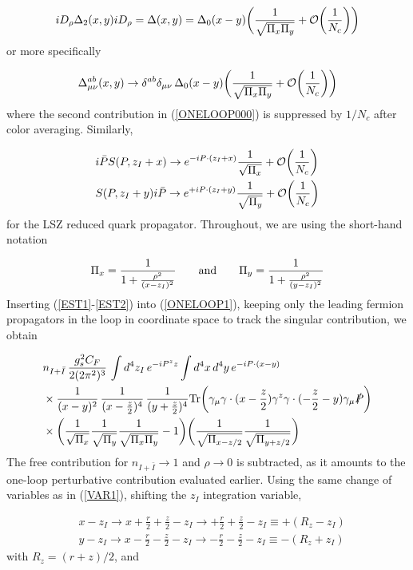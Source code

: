 \documentclass[11pt,aps,amsmath,amssymb,nofootinbib,notitlepage,longbibliography]{revtex4-1}
\newcommand{\be}{\begin{equation}}
\newcommand{\ee}{\end{equation}}
\begin{document}
\begin{align}
\label{ONELOOPX1}
iD_\rho\Delta_2(x,y)iD_\rho=\Delta(x,y)= \Delta_0(x-y)\bigg(\frac 1{\sqrt{\Pi_x\Pi_y}}+{\cal O}\bigg(\frac 1{N_c}\bigg)\bigg)
\end{align}
or more specifically


\be
\label{EST1}
\Delta^{ab}_{\mu\nu}(x,y)\rightarrow \delta^{ab}\delta_{\mu\nu}\,  \Delta_0(x-y)\bigg(\frac 1{\sqrt{\Pi_x\Pi_y}}+{\cal O}\bigg(\frac 1{N_c}\bigg)\bigg)
\ee
where the second contribution in (\ref{ONELOOP000}) is suppressed by $1/N_c$ after color averaging.
Similarly,

\begin{align}
\label{EST2}
&i\bar P S(P,z_I+x)\rightarrow {e^{-iP\cdot (z_I+x)}}\frac 1{\sqrt{\Pi_x}}+{\cal O}\bigg(\frac 1{N_c}\bigg)\nonumber\\
&S(P,z_I+y)i\bar P\rightarrow  {e^{+iP\cdot (z_I+y)}}\frac 1{\sqrt{\Pi_y}}+{\cal O}\bigg(\frac 1{N_c}\bigg)
\end{align}
for  the LSZ reduced quark propagator.
Throughout, we are using the short-hand notation

\be
\Pi_x=\frac 1{1+\frac{\rho^2}{(x-z_I)^2}}\qquad{\rm and}\qquad \Pi_y=\frac 1{1+\frac{\rho^2}{(y-z_I)^2}}
\ee
Inserting (\ref{EST1}-\ref{EST2}) into (\ref{ONELOOP1}), keeping only the
leading  fermion propagators in the loop in coordinate space to track the singular contribution, we obtain


\begin{align}\label{ONELOOP1X1}
&{n_{I+\bar I}}\,\frac{g_s^2C_F}{2(2\pi^2)^3}\,\int d^4z_{I} \,e^{-iP^zz}
\int d^4x \,d^4y\,e^{-iP\cdot (x-y)}\nonumber\\
&\times \frac 1{(x-y)^2}\,\frac 1{(x-\frac z2)^4}\,\frac 1{(y+\frac z2)^4}{\rm Tr}\bigg(\gamma_\mu \gamma\cdot (x-\frac z2)\gamma^z
\gamma\cdot (-\frac z2-y)\gamma_\mu\slashed P\bigg)\nonumber\\
&\times\bigg(\frac 1{\sqrt{\Pi_x}}\frac 1{\sqrt{\Pi_y}}\frac 1{\sqrt{\Pi_x\Pi_y}}-1\bigg)\bigg(\frac 1{\sqrt{\Pi_{x-z/2}}}\frac 1{\sqrt{\Pi_{y+z/2}}}\bigg)
\end{align}
The free contribution for $n_{I+\bar I}\rightarrow 1$ and $\rho\rightarrow 0$ is subtracted,
as it amounts to the one-loop  perturbative contribution evaluated earlier.
Using the same change of variables as in (\ref{VAR1}),  shifting
the $z_I$ integration variable,

\begin{align}
&x-z_I\rightarrow x+\frac r2 +\frac z2-z_I\rightarrow +\frac r2+\frac z2-z_I\equiv +(R_z-z_I)\nonumber\\
&y-z_I\rightarrow x-\frac r2 -\frac z2-z_I\rightarrow -\frac r2-\frac z2-z_I\equiv -(R_z+z_I)
\end{align}
with $R_z=(r+z)/2$, and
\end{document}
